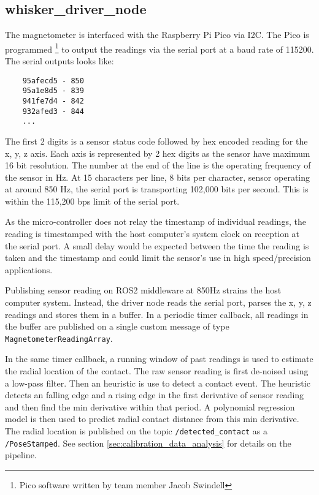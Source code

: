 \documentclass{article}
\begin{document}
\subsection{whisker\_driver\_node}

The magnetometer is interfaced with the Raspberry Pi Pico via I2C. The Pico is programmed \footnote{Pico software written by team member Jacob Swindell} to output the readings via the serial port at a baud rate of 115200. The serial outputs looks like:
\begin{verbatim}
    95afecd5 - 850
    95a1e8d5 - 839
    941fe7d4 - 842
    932afed3 - 844
    ...
\end{verbatim}

The first 2 digits is a sensor status code followed by hex encoded reading for the x, y, z axis. Each axis is represented by 2 hex digits as the sensor have maximum 16 bit resolution. The number at the end of the line is the operating frequency of the sensor in Hz. At 15 characters per line, 8 bits per character, sensor operating at around 850 Hz, the serial port is transporting 102,000 bits per second. This is within the 115,200 bps limit of the serial port.

As the micro-controller does not relay the timestamp of individual readings, the reading is timestamped with the host computer's system clock on reception at the serial port. A small delay would be expected between the time the reading is taken and the timestamp and could limit the sensor's use in high speed/precision applications.

Publishing sensor reading on ROS2 middleware at 850Hz strains the host computer system. Instead, the driver node reads the serial port, parses the x, y, z readings and stores them in a buffer. In a periodic timer callback, all readings in the buffer are published on a single custom message of type \verb|MagnetometerReadingArray|.

In the same timer callback, a running window of past readings is used to estimate the radial location of the contact. The raw sensor reading is first de-noised using a low-pass filter. Then an heuristic is use to detect a contact event. The heuristic detects an falling edge and a rising edge in the first derivative of sensor reading and then find the min derivative within that period. A polynomial regression model is then used to predict radial contact distance from this min derivative.
The radial location is published on the topic \verb|/detected_contact| as a \verb|/PoseStamped|. See section \ref{sec:calibration_data_analysis} for details on the pipeline.
\end{document}
